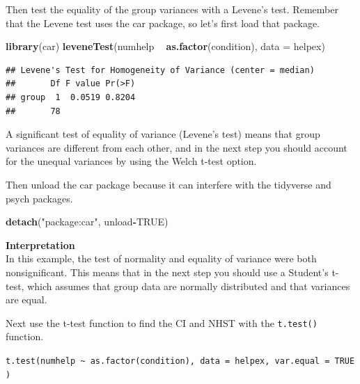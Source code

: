 \documentclass[
]{book}
\newenvironment{Shaded}{\begin{snugshade}}{\end{snugshade}}
\newcommand{\DataTypeTok}[1]{\textcolor[rgb]{0.13,0.29,0.53}{#1}}
\newcommand{\KeywordTok}[1]{\textcolor[rgb]{0.13,0.29,0.53}{\textbf{#1}}}
\newcommand{\NormalTok}[1]{#1}
\newcommand{\OperatorTok}[1]{\textcolor[rgb]{0.81,0.36,0.00}{\textbf{#1}}}
\newcommand{\OtherTok}[1]{\textcolor[rgb]{0.56,0.35,0.01}{#1}}
\newcommand{\StringTok}[1]{\textcolor[rgb]{0.31,0.60,0.02}{#1}}
\begin{document}
Then test the equality of the group variances with a Levene's test. Remember that the Levene test uses the car package, so let's first load that package.

\begin{Shaded}
\begin{Highlighting}[]
\KeywordTok{library}\NormalTok{(car) }
\KeywordTok{leveneTest}\NormalTok{(numhelp }\OperatorTok{~}\StringTok{ }\KeywordTok{as.factor}\NormalTok{(condition), }\DataTypeTok{data =}\NormalTok{ helpex)}
\end{Highlighting}
\end{Shaded}

\begin{verbatim}
## Levene's Test for Homogeneity of Variance (center = median)
##       Df F value Pr(>F)
## group  1  0.0519 0.8204
##       78
\end{verbatim}

A significant test of equality of variance (Levene's test) means that group variances are different from each other, and in the next step you should account for the unequal variances by using the Welch t-test option.

Then unload the car package because it can interfere with the tidyverse and psych packages.

\begin{Shaded}
\begin{Highlighting}[]
\KeywordTok{detach}\NormalTok{(}\StringTok{"package:car"}\NormalTok{, unload}\OperatorTok{-}\OtherTok{TRUE}\NormalTok{)}
\end{Highlighting}
\end{Shaded}

\textbf{Interpretation}\\
In this example, the test of normality and equality of variance were both nonsignificant. This means that in the next step you should use a Student's t-test, which assumes that group data are normally distributed and that variances are equal.

Next use the t-test function to find the CI and NHST with the \texttt{t.test()} function.

\texttt{t.test(numhelp\ \textasciitilde{}\ as.factor(condition),\ data\ =\ helpex,\ var.equal\ =\ TRUE)}
\end{document}
